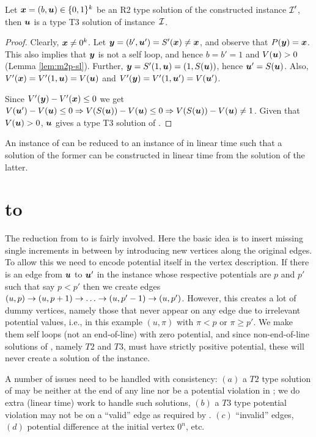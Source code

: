 \begin{lemma}\label{lem:m2p-r2}
Let $\mbox{\boldmath $x$}=(b,\mbox{\boldmath $u$})\in \{0,1\}^k$ be an R2 type solution of the constructed \EOPL instance $\mbox{${\mathcal I}$}'$, then $\mbox{\boldmath $u$}$ is a type T3 solution of \EOML instance~$\mbox{${\mathcal I}$}$.
\end{lemma}
\begin{proof}
Clearly, $\mbox{\boldmath $x$}\neq 0^k$. Let $\mbox{\boldmath $y$} = (b',\mbox{\boldmath $u$}') = S'(\mbox{\boldmath $x$}) \neq \mbox{\boldmath $x$}$, and observe that $P(\mbox{\boldmath $y$}) = \mbox{\boldmath $x$}$. This also implies that $\mbox{\boldmath $y$}$ is not a self loop, and hence $b=b'=1$ and $V(\mbox{\boldmath $u$})>0$ (Lemma \ref{lem:m2p-sl}). Further, $\mbox{\boldmath $y$} = S'(1,\mbox{\boldmath $u$})=(1,S(\mbox{\boldmath $u$}))$, hence $\mbox{\boldmath $u$}'=S(\mbox{\boldmath $u$})$. Also, $V'(\mbox{\boldmath $x$})=V'(1,\mbox{\boldmath $u$})=V(\mbox{\boldmath $u$})$ and $V'(\mbox{\boldmath $y$})=V'(1,\mbox{\boldmath $u$}')=V(\mbox{\boldmath $u$}')$. 

Since $V'(\mbox{\boldmath $y$})-V'(\mbox{\boldmath $x$})\le 0$ we get $V(\mbox{\boldmath $u$}')-V(\mbox{\boldmath $u$})\le 0 \Rightarrow V(S(\mbox{\boldmath $u$})) - V(\mbox{\boldmath $u$}) \le 0\Rightarrow V(S(\mbox{\boldmath $u$})) - V(\mbox{\boldmath $u$})\neq 1$. Given that $V(\mbox{\boldmath $u$})>0$, $\mbox{\boldmath $u$}$ gives a type T3 solution of \EOML.
\end{proof}

\begin{theorem}\label{thm:m2p}
An instance of \EOML can be reduced to an instance of \EOPL in linear time such that a solution of the former can be constructed in linear time from the solution of the latter. 
\end{theorem}

\section{\EOPL to \EOML}
\label{sec:eopl2eoml}

The reduction from \EOPL to \EOML is fairly involved. Here the basic idea is to insert missing single
increments in between by introducing new vertices along the original edges. To
allow this we need to encode potential itself in the vertex description. If
there is an edge from $\mbox{\boldmath $u$}$ to $\mbox{\boldmath $u$}'$ in the \EOPL instance whose respective
potentials are $p$ and $p'$ such that say $p<p'$ then we create edges $(u,p)\ra
(u,p+1)\ra \dots \ra (u,p'-1)\ra (u,p')$. However, this creates a lot of dummy
vertices, namely those that never appear on any edge due to irrelevant potential
values, i.e., in this example $(u,\pi)$ with $\pi <p$ or $\pi\ge p'$. We make
them self loops (not an end-of-line) with zero potential, and since
non-end-of-line solutions of \EOML, namely $T2$ and $T3$, must have strictly
positive potential, these will never create a solution of the \EOML instance.

A number of issues need to be handled with consistency: $(a)$
a $T2$ type solution of \EOML may be neither at the end of any line nor be a 
potential violation in \EOPL; we do extra (linear time) work to handle such
solutions, $(b)$ a $T3$ type potential violation may not be on a ``valid'' edge as
required by \EOPL. $(c)$ ``invalid'' edges, $(d)$ potential difference at the
initial vertex $0^n$, etc.

